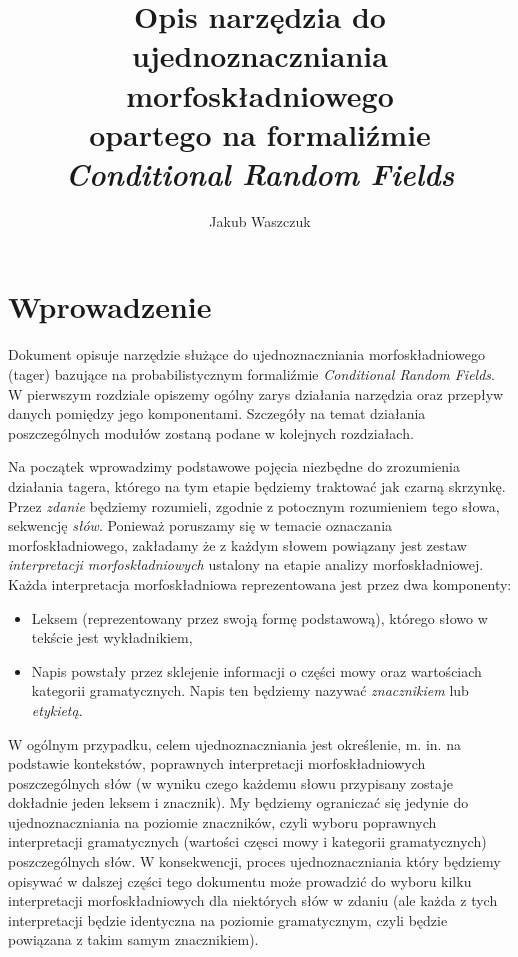 \documentclass[a4paper,10]{article}
\title{Opis narzędzia do\\ ujednoznaczniania morfoskładniowego\\ opartego na formaliźmie\\ \emph{Conditional Random Fields}}
\author{Jakub Waszczuk}
\begin{document}


\maketitle

\tableofcontents

\clearpage

\section{Wprowadzenie}

Dokument opisuje narzędzie służące do ujednoznaczniania morfoskładniowego (tager) 
bazujące na probabilistycznym formaliźmie \emph{Conditional Random Fields}.
W pierwszym rozdziale opiszemy ogólny zarys działania narzędzia oraz przepływ
danych pomiędzy jego komponentami. Szczegóły na temat działania poszczególnych
modułów zostaną podane w kolejnych rozdziałach.

Na początek wprowadzimy podstawowe pojęcia niezbędne do zrozumienia
działania tagera, którego na tym etapie będziemy traktować jak czarną skrzynkę.
Przez \emph{zdanie} będziemy rozumieli, zgodnie z potocznym rozumieniem tego
słowa, sekwencję \emph{słów}. Ponieważ poruszamy się w temacie oznaczania
morfoskładniowego, zakładamy że z każdym słowem powiązany jest zestaw
\emph{interpretacji morfoskładniowych} ustalony na etapie analizy morfoskładniowej.
Każda interpretacja morfoskładniowa reprezentowana jest przez dwa komponenty:
\begin{itemize}
\item Leksem (reprezentowany przez swoją formę podstawową), którego słowo
w tekście jest wykładnikiem,
\item Napis powstały przez sklejenie informacji o części mowy oraz wartościach
kategorii gramatycznych. Napis ten będziemy nazywać \emph{znacznikiem} lub \emph{etykietą}.
\end{itemize}
W ogólnym przypadku, celem ujednoznaczniania jest określenie, m. in. na podstawie
kontekstów, poprawnych interpretacji morfoskładniowych poszczególnych
słów (w wyniku czego każdemu słowu przypisany zostaje dokładnie jeden
leksem i znacznik).
My będziemy ograniczać się jedynie do ujednoznaczniania na poziomie znaczników,
czyli wyboru poprawnych interpretacji gramatycznych (wartości częsci mowy i kategorii
gramatycznych) poszczególnych słów.
W konsekwencji, proces ujednoznaczniania który będziemy opisywać w dalszej
części tego dokumentu może prowadzić do wyboru kilku interpretacji
morfoskładniowych dla niektórych słów w zdaniu (ale każda z tych interpretacji
będzie identyczna na poziomie gramatycznym, czyli będzie powiązana z takim
samym znacznikiem).
\end{document}
